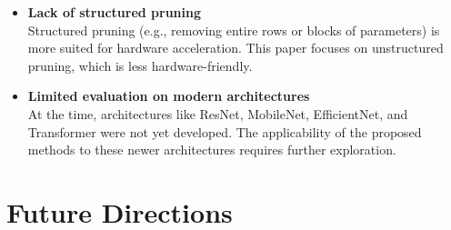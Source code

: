 \documentclass[12pt]{article}
\begin{document}
\begin{itemize}
    \item \textbf{Lack of structured pruning}\\
    Structured pruning (e.g., removing entire rows or blocks of parameters) is more suited for hardware acceleration. This paper focuses on unstructured pruning, which is less hardware-friendly.

    \item \textbf{Limited evaluation on modern architectures}\\
    At the time, architectures like ResNet, MobileNet, EfficientNet, and Transformer were not yet developed. The applicability of the proposed methods to these newer architectures requires further exploration.
\end{itemize}

\section{Future Directions}
\end{document}
